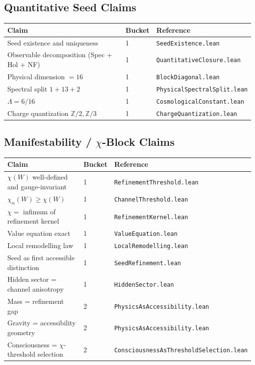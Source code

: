 \subsection*{Quantitative Seed Claims}

\begin{center}
\small
\begin{tabular}{@{}lll@{}}
\hline
\textbf{Claim} & \textbf{Bucket} & \textbf{Reference} \\
\hline
Seed existence and uniqueness & 1 & \texttt{SeedExistence.lean} \\
Observable decomposition (Spec + Hol + NF) & 1 & \texttt{QuantitativeClosure.lean} \\
Physical dimension $= 16$ & 1 & \texttt{BlockDiagonal.lean} \\
Spectral split $1 + 13 + 2$ & 1 & \texttt{PhysicalSpectralSplit.lean} \\
$\Lambda = 6/16$ & 1 & \texttt{CosmologicalConstant.lean} \\
Charge quantization $\mathbb{Z}/2, \mathbb{Z}/3$ & 1 & \texttt{ChargeQuantization.lean} \\
\hline
\end{tabular}
\end{center}

\subsection*{Manifestability / $\chi$-Block Claims}

\begin{center}
\small
\begin{tabular}{@{}lll@{}}
\hline
\textbf{Claim} & \textbf{Bucket} & \textbf{Reference} \\
\hline
$\chi(W)$ well-defined and gauge-invariant & 1 & \texttt{RefinementThreshold.lean} \\
$\chi_\alpha(W) \geq \chi(W)$ & 1 & \texttt{ChannelThreshold.lean} \\
$\chi =$ infimum of refinement kernel & 1 & \texttt{RefinementKernel.lean} \\
Value equation exact & 1 & \texttt{ValueEquation.lean} \\
Local remodelling law & 1 & \texttt{LocalRemodelling.lean} \\
Seed as first accessible distinction & 1 & \texttt{SeedRefinement.lean} \\
Hidden sector = channel anisotropy & 1 & \texttt{HiddenSector.lean} \\
Mass = refinement gap & 2 & \texttt{PhysicsAsAccessibility.lean} \\
Gravity = accessibility geometry & 2 & \texttt{PhysicsAsAccessibility.lean} \\
Consciousness = $\chi$-threshold selection & 2 & \texttt{ConsciousnessAsThresholdSelection.lean} \\
\hline
\end{tabular}
\end{center}

